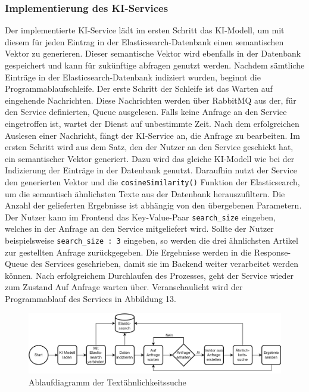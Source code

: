\subsubsection{Implementierung des KI-Services}
Der implementierte KI-Service lädt im ersten Schritt das KI-Modell, um mit diesem für jeden Eintrag in der Elasticsearch-Datenbank einen semantischen Vektor zu generieren. Dieser semantische Vektor wird ebenfalls in der Datenbank gespeichert und kann für zukünftige abfragen genutzt werden.
Nachdem sämtliche Einträge in der Elasticsearch-Datenbank indiziert wurden, beginnt die Programmablaufschleife. Der erste Schritt der Schleife ist das Warten auf eingehende Nachrichten. Diese Nachrichten werden über RabbitMQ aus der, für den Service definierten, Queue ausgelesen. Falls keine Anfrage an den Service eingetroffen ist, wartet der Dienst auf unbestimmte Zeit. Nach dem erfolgreichen Auslesen einer Nachricht, fängt der KI-Service an, die Anfrage zu bearbeiten. Im ersten Schritt wird aus dem Satz, den der Nutzer an den Service geschickt hat, ein semantischer Vektor generiert. Dazu wird das gleiche KI-Modell wie bei der Indizierung der Einträge in der Datenbank genutzt. Daraufhin nutzt der Service den generierten Vektor und die \texttt{cosineSimilarity()} Funktion der Elasticsearch, um die semantisch ähnlichsten Texte aus der Datenbank herauszufiltern. Die Anzahl der gelieferten Ergebnisse ist abhängig von den übergebenen Parametern. Der Nutzer kann im Frontend das Key-Value-Paar \texttt{search\_{}size} eingeben, welches in der Anfrage an den Service mitgeliefert wird. Sollte der Nutzer beispielsweise \texttt{\glqq search\_{}size : 3\grqq{}} eingeben, so werden die drei ähnlichsten Artikel zur gestellten Anfrage zurückgegeben. Die Ergebnisse werden in die Response-Queue des Services geschrieben, damit sie im Backend weiter verarbeitet werden können. Nach erfolgreichem Durchlaufen des Prozesses, geht der Service wieder zum Zustand \glqq Auf Anfrage warten\grqq{} über. Veranschaulicht wird der Programmablauf des Services in Abbildung 13.

\begin{figure}[H]
  \centering
    \includegraphics[width = 15cm]{bilder/KIAblauf}
    \caption{Ablaufdiagramm der Textähnlichkeitssuche}
\end{figure}

